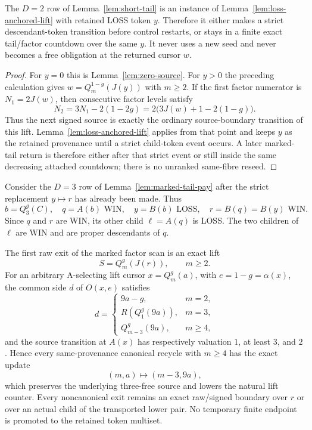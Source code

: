 \begin{lemma}[The $D=2$ exact lift remains LOSS-anchored]
\label{lem:D2-pure}
The $D=2$ row of Lemma~\ref{lem:short-tail} is an instance of
Lemma~\ref{lem:loss-anchored-lift} with retained LOSS token $y$.  Therefore
it either makes a strict descendant-token transition before control restarts,
or stays in a finite exact tail/factor countdown over the same $y$.  It never
uses a new seed and never becomes a free obligation at the returned cursor
$w$.
\end{lemma}

\begin{proof}
For $y=0$ this is Lemma~\ref{lem:zero-source}.  For $y>0$ the preceding
calculation gives $w=Q_m^{1-g}(J(y))$ with $m\ge2$.  If the first factor
numerator is $N_1=2J(w)$, then consecutive factor levels satisfy
\[
 N_2=3N_1-2(1-2g)
    =2\bigl(3J(w)+1-2(1-g)\bigr).
\]
Thus the next signed source is exactly the ordinary source-boundary
transition of this lift.  Lemma~\ref{lem:loss-anchored-lift} applies from
that point and keeps $y$ as the retained provenance until a strict
child-token event occurs.  A later marked-tail return is therefore either
after that strict event or still inside the same decreasing attached
countdown; there is no unranked same-fibre reseed.
\end{proof}

\begin{lemma}
\label{lem:attached-lift}
Consider the $D=3$ row of Lemma~\ref{lem:marked-tail-pay} after the strict
replacement $y\mapsto r$ has already been made. Thus
\[
 b=Q_3^g(C),\quad q=A(b)\text{ WIN},\quad y=B(b)\text{ LOSS},\quad
 r=B(q)=B(y)\text{ WIN}.
\]
Since $q$ and $r$ are WIN, its other child $\ell=A(q)$ is LOSS. The two
children of $\ell$ are WIN and are proper descendants of $q$.

The first raw exit of the marked factor scan is an exact lift
\[
 S=Q_m^g(J(r)),\qquad m\ge2.
\]
For an arbitrary A-selecting lift cursor $x=Q_m^g(a)$, with
$e=1-g=\alpha(x)$, the common side $d$ of $O(x,e)$ satisfies
\[
 d=\begin{cases}
 9a-g,&m=2,\\
 R(Q_1^g(9a)),&m=3,\\
 Q_{m-3}^g(9a),&m\ge4,
 \end{cases}
\]
and the source transition at $A(x)$ has respectively valuation $1$, at least
$3$, and $2$. Hence every same-provenance canonical recycle with $m\ge4$
has the exact update
\[
 (m,a)\longmapsto(m-3,9a),
\]
which preserves the underlying three-free source and lowers the natural lift
counter. Every noncanonical exit remains an exact raw/signed boundary over
$r$ or over an actual child of the transported lower pair. No temporary
finite endpoint is promoted to the retained token multiset.
\end{lemma}


